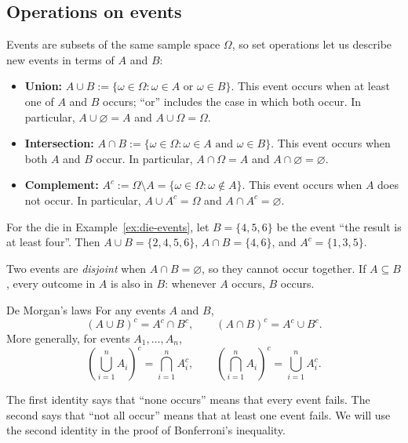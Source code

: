 \documentclass[a4paper,12pt,oneside]{report}
\begin{document}
\subsection{Operations on events}

Events are subsets of the same sample space $\Omega$, so set operations
let us describe new events in terms of $A$ and $B$:

\begin{itemize}
  \item \textbf{Union:}
  $A\cup B:=\{\omega\in\Omega:\omega\in A\text{ or }\omega\in B\}$.
  This event occurs when at least one of $A$ and $B$ occurs;
  ``or'' includes the case in which both occur.
  In particular, $A\cup\varnothing=A$ and $A\cup\Omega=\Omega$.

  \item \textbf{Intersection:}
  $A\cap B:=\{\omega\in\Omega:\omega\in A\text{ and }\omega\in B\}$.
  This event occurs when both $A$ and $B$ occur.
  In particular, $A\cap\Omega=A$ and $A\cap\varnothing=\varnothing$.

  \item \textbf{Complement:}
  $A^c:=\Omega\setminus A
       =\{\omega\in\Omega:\omega\notin A\}$.
  This event occurs when $A$ does not occur.
  In particular, $A\cup A^c=\Omega$ and $A\cap A^c=\varnothing$.
\end{itemize}

For the die in Example~\ref{ex:die-events}, let
$B=\{4,5,6\}$ be the event ``the result is at least four''. Then
$A\cup B=\{2,4,5,6\}$, $A\cap B=\{4,6\}$, and
$A^c=\{1,3,5\}$.

Two events are \emph{disjoint} when $A\cap B=\varnothing$, so they
cannot occur together. If $A\subseteq B$, every outcome in $A$ is
also in $B$: whenever $A$ occurs, $B$ occurs.

\begin{framedprop}{De Morgan's laws}\label{prop:de-morgan}
For any events $A$ and $B$,
\[
  (A\cup B)^c=A^c\cap B^c,
  \qquad
  (A\cap B)^c=A^c\cup B^c.
\]
More generally, for events $A_1,\ldots,A_n$,
\[
  \left(\bigcup_{i=1}^{n}A_i\right)^c
    =\bigcap_{i=1}^{n}A_i^c,
  \qquad
  \left(\bigcap_{i=1}^{n}A_i\right)^c
    =\bigcup_{i=1}^{n}A_i^c.
\]
\end{framedprop}

The first identity says that ``none occurs'' means that every event
fails. The second says that ``not all occur'' means that at least one
event fails. We will use the second identity in the proof of
Bonferroni's inequality.
\end{document}
